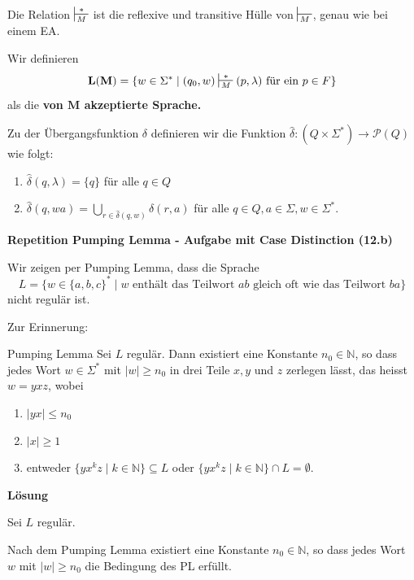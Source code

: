 \documentclass[a4paper, 11pt]{article}
\def\N{\mathbb{N}}
\newcommand\myTitle[1]{{\large \textbf {#1}}}
\begin{document}
   
    Die Relation $\sststile{M}{*}$ ist die reflexive und transitive Hülle von $\sststile{M}{}$, genau wie bei einem EA.

    Wir definieren $$\mathbf{L(M)} = \{w \in \Sigma^* \mid (q_0, w) \sststile{M}{*} (p, \lambda) \text{ für ein } p \in F\}$$ als die \textbf{von $\mathbf{M}$ akzeptierte Sprache.}
    \begin{mainbox}{}
        Zu der Übergangsfunktion $\delta$ definieren wir die Funktion $\hat{\delta}: (Q \times \Sigma^*) \to \mathcal{P}(Q)$ wie folgt:
        \begin{enumerate}[label=(\roman*)]
            \item $\hat{\delta}(q, \lambda) = \{q\}$ für alle $q \in Q$
            \item $\hat{\delta}(q, wa) = \bigcup_{r \in \hat{\delta}(q,w)}\delta(r,a)$ für alle $q\in Q, a \in \Sigma, w \in \Sigma^*$.
        \end{enumerate}
    \end{mainbox}

    
    \myTitle{Repetition Pumping Lemma - Aufgabe mit Case Distinction (12.b)}

        Wir zeigen per Pumping Lemma, dass die Sprache 
        $$L = \{w \in \{a, b, c\}^* \mid w \text{ enthält das Teilwort $ab$ gleich oft wie das Teilwort $ba$}\}$$
        nicht regulär ist.
    

        Zur Erinnerung:
        \begin{mainbox}{Pumping Lemma}
            Sei $L$ regulär. Dann existiert eine Konstante $n_0 \in \N$, so dass jedes Wort $w \in \Sigma^*$ mit $|w| \geq n_0$ in drei Teile $x, y$ und $z$ zerlegen lässt, das heisst $w = yxz$, wobei
            \begin{enumerate}[label=(\roman*)]
                \item $|yx| \leq n_0$
                \item $|x| \geq 1$
                \item entweder $\{yx^kz \mid k \in \N\} \subseteq L$ oder $\{yx^kz \mid k \in \N\} \cap L = \emptyset$.
            \end{enumerate}
        \end{mainbox}
    
        \textbf{Lösung}
    
        Sei $L$ regulär. 
        
        Nach dem Pumping Lemma existiert eine Konstante $n_0 \in \N$, so dass jedes Wort $w$ mit $|w| \geq n_0$ die Bedingung des PL erfüllt.
        
\end{document}
